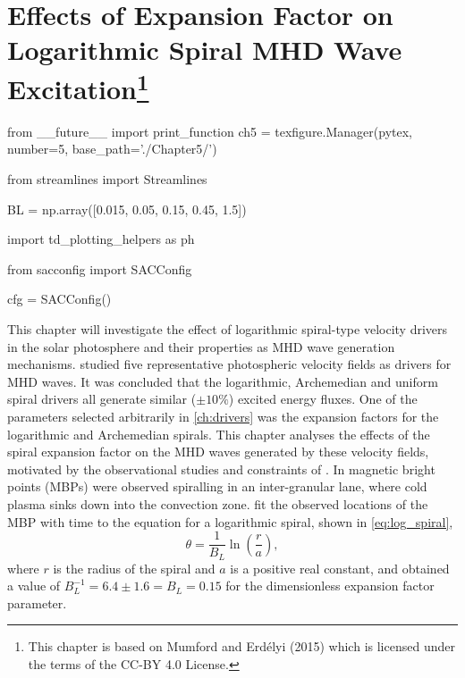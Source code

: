 
\chapter[]{Effects of Expansion Factor on Logarithmic Spiral MHD Wave Excitation\footnote{This chapter is based on Mumford and Erd\'elyi (2015) which is licensed under the terms of the CC-BY 4.0 License.}}\label{ch:expfac}

\begin{pycode}[chapter5]
from __future__ import print_function
ch5 = texfigure.Manager(pytex, number=5, base_path='./Chapter5/')

from streamlines import Streamlines

BL = np.array([0.015, 0.05, 0.15, 0.45, 1.5])

import td_plotting_helpers as ph

from sacconfig import SACConfig

cfg = SACConfig()
\end{pycode}

This chapter will investigate the effect of logarithmic spiral-type velocity drivers in the solar photosphere and their properties as MHD wave generation mechanisms.
 studied five representative photospheric velocity fields as drivers for MHD waves.
It was concluded that the logarithmic, Archemedian and uniform spiral drivers all generate similar ($\pm 10\%$) excited energy fluxes.
One of the parameters selected arbitrarily in \cref{ch:drivers} was the expansion factors for the logarithmic and Archemedian spirals.
This chapter analyses the effects of the spiral expansion factor on the MHD waves generated by these velocity fields, motivated by the observational studies and constraints of \cite{bonet2008}.
In \cite{bonet2008} magnetic bright points (MBPs) were observed spiralling in an inter-granular lane, where cold plasma sinks down into the convection zone.
\cite{bonet2008} fit the observed locations of the MBP with time to the equation for a logarithmic spiral, shown in \cref{eq:log_spiral},
\begin{equation}
\theta = \frac{1}{B_L}\ln\left(\frac{r}{a}\right),
\label{eq:log_spiral}
\end{equation}
\citep{feynman1964} where $r$ is the radius of the spiral and $a$ is a positive real constant, and obtained a value of $B_L^{-1} = 6.4 \pm 1.6 = B_L = 0.15$ for the dimensionless expansion factor parameter.

